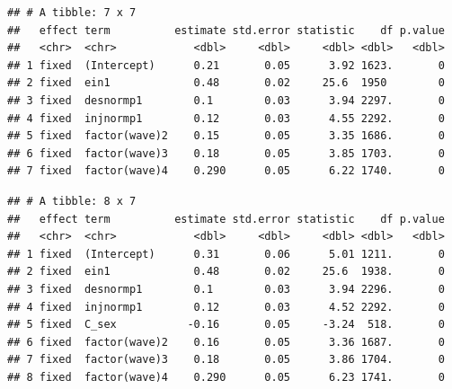 \documentclass[
]{book}
\newenvironment{Shaded}{\begin{snugshade}}{\end{snugshade}}
\newcommand{\DataTypeTok}[1]{\textcolor[rgb]{0.13,0.29,0.53}{#1}}
\newcommand{\DecValTok}[1]{\textcolor[rgb]{0.00,0.00,0.81}{#1}}
\newcommand{\KeywordTok}[1]{\textcolor[rgb]{0.13,0.29,0.53}{\textbf{#1}}}
\newcommand{\NormalTok}[1]{#1}
\newcommand{\OperatorTok}[1]{\textcolor[rgb]{0.81,0.36,0.00}{\textbf{#1}}}
\newcommand{\StringTok}[1]{\textcolor[rgb]{0.31,0.60,0.02}{#1}}
\begin{document}
\begin{verbatim}
## # A tibble: 7 x 7
##   effect term          estimate std.error statistic    df p.value
##   <chr>  <chr>            <dbl>     <dbl>     <dbl> <dbl>   <dbl>
## 1 fixed  (Intercept)      0.21       0.05      3.92 1623.       0
## 2 fixed  ein1             0.48       0.02     25.6  1950        0
## 3 fixed  desnormp1        0.1        0.03      3.94 2297.       0
## 4 fixed  injnormp1        0.12       0.03      4.55 2292.       0
## 5 fixed  factor(wave)2    0.15       0.05      3.35 1686.       0
## 6 fixed  factor(wave)3    0.18       0.05      3.85 1703.       0
## 7 fixed  factor(wave)4    0.290      0.05      6.22 1740.       0
\end{verbatim}

\begin{Shaded}
\end{Shaded}

\begin{verbatim}
## # A tibble: 8 x 7
##   effect term          estimate std.error statistic    df p.value
##   <chr>  <chr>            <dbl>     <dbl>     <dbl> <dbl>   <dbl>
## 1 fixed  (Intercept)      0.31       0.06      5.01 1211.       0
## 2 fixed  ein1             0.48       0.02     25.6  1938.       0
## 3 fixed  desnormp1        0.1        0.03      3.94 2296.       0
## 4 fixed  injnormp1        0.12       0.03      4.52 2292.       0
## 5 fixed  C_sex           -0.16       0.05     -3.24  518.       0
## 6 fixed  factor(wave)2    0.16       0.05      3.36 1687.       0
## 7 fixed  factor(wave)3    0.18       0.05      3.86 1704.       0
## 8 fixed  factor(wave)4    0.290      0.05      6.23 1741.       0
\end{verbatim}
\end{document}
